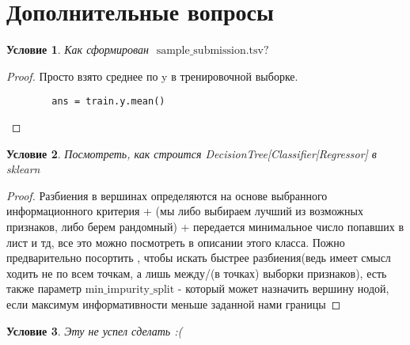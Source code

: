 \documentclass{article}
\theoremstyle{plain}
\newtheorem{condi}{Условие}
\theoremstyle{definition}
\begin{document}
\section{Дополнительные вопросы}

\begin{condi}
	Как сформирован $\text{ sample\_submission.tsv? }$
\end{condi}
\begin{proof}
	Просто взято среднее по y в тренировочной выборке.
	\begin{lstlisting}
		ans = train.y.mean()
	\end{lstlisting}
\end{proof}

\begin{condi}
	Посмотреть, как строится DecisionTree[Classifier|Regressor] в sklearn
\end{condi}

\begin{proof}
	Разбиения в вершинах определяются на основе выбранного информационного критерия + (мы либо выбираем лучший из возможных признаков, либо берем рандомный) + передается минимальное число попавших в лист и тд, все это можно посмотреть в описании этого класса. Пожно предварительно посортить , чтобы искать быстрее разбиения(ведь имеет смысл ходить не по всем точкам, а лишь между/(в точках) выборки признаков), есть также параметр $\text{min\_impurity\_split}$ - который может назначить вершину нодой, если максимум информативности меньше заданной нами границы
\end{proof}

\begin{condi}
	Эту не успел сделать :(
\end{condi}
\end{document}
